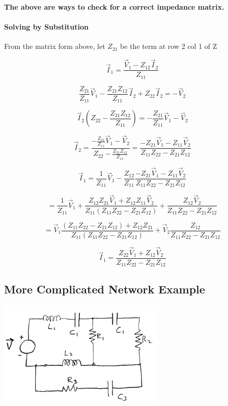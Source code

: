 \textbf{The above are ways to check for a correct impedance matrix.}

\paragraph{Solving by Substitution}

From the matrix form above, let $Z_{21}$ be the term at row 2 col 1 of Z


\[\vec{I}_1 = \frac{\vec V_1 - Z_{12}\vec{I}_2}{Z_{11}}\]

\[\frac{Z_{21}}{Z_{11}} \vec{V}_1 - \frac{Z_{21}Z_{12}}{Z_{11}}\vec{I}_2 + Z_{22}\vec{I}_2 = -\vec{V}_2\]

\[\vec{I}_2\left(Z_{22} - \frac{Z_{21}Z_{12}}{Z_{11}}\right) = -\frac{Z_{21}}{Z_{11}}\vec V_1 - \vec V_2\]

\[\vec{I}_2 = \frac{-\frac{Z_{21}}{Z_{11}}\vec V_1 - \vec V_2}{Z_{22} - \frac{Z_{21}Z_{12}}{Z_{11}}} = \frac{-Z_{21}\vec V_1 - Z_{11}\vec V_2}{Z_{11}Z_{22} - Z_{21}Z_{12}}\]

\[\vec{I}_1 = \frac{1}{Z_{11}}\vec V_1 - \frac{Z_{12}}{Z_{11}} \frac{-Z_{21}\vec V_1 - Z_{11}\vec V_2}{Z_{11}Z_{22} - Z_{21}Z_{12}}\]

\[= \frac{1}{Z_{11}}\vec V_1 + \frac{Z_{12}Z_{21}\vec V_1 + Z_{12}Z_{11}\vec V_2}{Z_{11}(Z_{11}Z_{22} - Z_{21}Z_{12})} + \frac{Z_{12} \vec V_2}{Z_{11}Z_{22} - Z_{21}Z_{12}}\]

\[= \vec V_1 \frac{(Z_{11}Z_{22} - Z_{21}Z_{12}) + Z_{12}Z_{21}}{Z_{11}(Z_{11}Z_{22} - Z_{21}Z_{12})} + \vec V_2 \frac{Z_{12}}{Z_{11}Z_{22} - Z_{21}Z_{12}}\]

\[\vec{I}_1 = \frac{Z_{22}\vec V_1 + Z_{12}\vec V_2}{Z_{11}Z_{22} - Z_{21}Z_{12}}\]

\subsection{More Complicated Network Example}


\includegraphics[width=0.6\textwidth]{figsChapt02/EU33724.png} %

